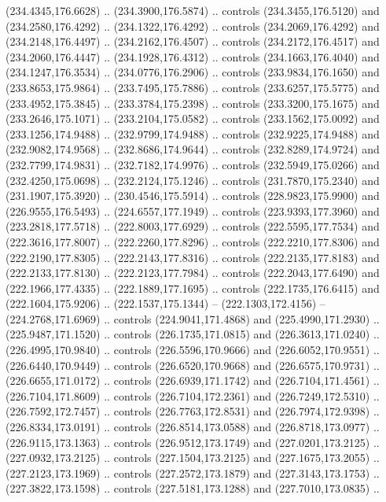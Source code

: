 \begin{scope}[cm={{1.25,0.0,0.0,-1.25,(0.0,442.91375)}}]
    (234.4345,176.6628) .. (234.3900,176.5874) .. controls (234.3455,176.5120) and
    (234.2580,176.4292) .. (234.1322,176.4292) .. controls (234.2069,176.4292) and
    (234.2148,176.4497) .. (234.2162,176.4507) .. controls (234.2172,176.4517) and
    (234.2060,176.4447) .. (234.1928,176.4312) .. controls (234.1663,176.4040) and
    (234.1247,176.3534) .. (234.0776,176.2906) .. controls (233.9834,176.1650) and
    (233.8653,175.9864) .. (233.7495,175.7886) .. controls (233.6257,175.5775) and
    (233.4952,175.3845) .. (233.3784,175.2398) .. controls (233.3200,175.1675) and
    (233.2646,175.1071) .. (233.2104,175.0582) .. controls (233.1562,175.0092) and
    (233.1256,174.9488) .. (232.9799,174.9488) .. controls (232.9225,174.9488) and
    (232.9082,174.9568) .. (232.8686,174.9644) .. controls (232.8289,174.9724) and
    (232.7799,174.9831) .. (232.7182,174.9976) .. controls (232.5949,175.0266) and
    (232.4250,175.0698) .. (232.2124,175.1246) .. controls (231.7870,175.2340) and
    (231.1907,175.3920) .. (230.4546,175.5914) .. controls (228.9823,175.9900) and
    (226.9555,176.5493) .. (224.6557,177.1949) .. controls (223.9393,177.3960) and
    (223.2818,177.5718) .. (222.8003,177.6929) .. controls (222.5595,177.7534) and
    (222.3616,177.8007) .. (222.2260,177.8296) .. controls (222.2210,177.8306) and
    (222.2190,177.8305) .. (222.2143,177.8316) .. controls (222.2135,177.8183) and
    (222.2133,177.8130) .. (222.2123,177.7984) .. controls (222.2043,177.6490) and
    (222.1966,177.4335) .. (222.1889,177.1695) .. controls (222.1735,176.6415) and
    (222.1604,175.9206) .. (222.1537,175.1344) -- (222.1303,172.4156) --
    (224.2768,171.6969) .. controls (224.9041,171.4868) and (225.4990,171.2930) ..
    (225.9487,171.1520) .. controls (226.1735,171.0815) and (226.3613,171.0240) ..
    (226.4995,170.9840) .. controls (226.5596,170.9666) and (226.6052,170.9551) ..
    (226.6440,170.9449) .. controls (226.6520,170.9668) and (226.6575,170.9731) ..
    (226.6655,171.0172) .. controls (226.6939,171.1742) and (226.7104,171.4561) ..
    (226.7104,171.8609) .. controls (226.7104,172.2361) and (226.7249,172.5310) ..
    (226.7592,172.7457) .. controls (226.7763,172.8531) and (226.7974,172.9398) ..
    (226.8334,173.0191) .. controls (226.8514,173.0588) and (226.8718,173.0977) ..
    (226.9115,173.1363) .. controls (226.9512,173.1749) and (227.0201,173.2125) ..
    (227.0932,173.2125) .. controls (227.1504,173.2125) and (227.1675,173.2055) ..
    (227.2123,173.1969) .. controls (227.2572,173.1879) and (227.3143,173.1753) ..
    (227.3822,173.1598) .. controls (227.5181,173.1288) and (227.7010,173.0835) ..

\end{scope}
